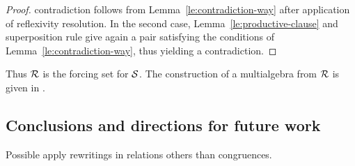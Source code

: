 \begin{proof}
contradiction follows from Lemma~\ref{le:contradiction-way} after
application of reflexivity resolution. In the second case, 
Lemma~\ref{le:productive-clause} and superposition rule give again a pair
satisfying the conditions of Lemma~\ref{le:contradiction-way}, thus yielding a
contradiction.
%
%
%
%
\end{proof}
\noindent
Thus $\mbox {$\cal R$}$ is the forcing set for $\mbox {$\cal S$}$.  The construction
of a multialgebra from $\mbox {$\cal R$}$ is given in \cite {KW}.

\subsection*{Conclusions and directions for future work}

Possible apply rewritings in relations others than congruences.

